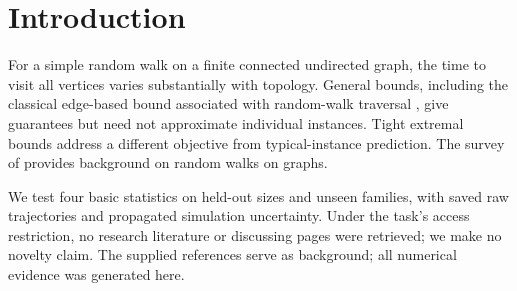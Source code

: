 \documentclass{article}
\begin{document}
\printAffiliationsAndNotice{}

\begin{abstract}
Can a few inexpensive graph statistics predict random-walk cover times more
closely than a general upper bound? We generate 133 connected graphs with
8--30 vertices from ten families and estimate their uniform-start mean cover
times with 4,000 independent walks each. A fixed log-linear ridge model using
vertex count, edge count, maximum degree, and diameter achieves a
family-balanced test mean absolute percentage error of 20.1\%, with a
Monte Carlo 95\% interval of [19.8, 20.5]\%, compared with 75.9\% for a fitted
size-only model. Accuracy depends strongly on family: errors are about 5\%
on stars but 50--55\% on grids and dense random graphs. Leaving an entire
family out of training raises overall error to 31.3\%. These results support
a useful empirical approximation on this graph collection, without a
uniform accuracy guarantee over small connected graphs.
\end{abstract}

\section{Introduction}
For a simple random walk on a finite connected undirected graph, the time to
visit all vertices varies substantially with topology. General bounds,
including the classical edge-based bound associated with random-walk
traversal \citep{aleliunas1979}, give guarantees but need not approximate
individual instances. Tight extremal bounds \citep{feige1995} address a
different objective from typical-instance prediction. The survey of
\citet{lovasz1993} provides background on random walks on graphs.

We test four basic statistics on held-out sizes and unseen families,
with saved raw trajectories and propagated simulation uncertainty.
Under the task's access restriction, no research literature or discussing
pages were retrieved; we make no novelty claim. The supplied references
serve as background; all numerical evidence was generated here.
\end{document}
